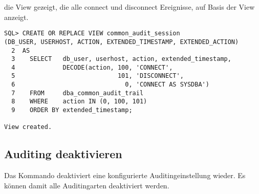         die View  gezeigt, die alle connect
        und disconnect Ereignisse, auf Basis der View
           anzeigt.
        \begin{lstlisting}[caption={Eine eigene View f\"ur dba\_common\_audit\_trail},label=admin817,language=oracle_sql]
SQL> CREATE OR REPLACE VIEW common_audit_session
(DB_USER, USERHOST, ACTION, EXTENDED_TIMESTAMP, EXTENDED_ACTION)
  2  AS
  3    SELECT   db_user, userhost, action, extended_timestamp,
  4             DECODE(action, 100, 'CONNECT',
  5                            101, 'DISCONNECT',
  6                              0, 'CONNECT AS SYSDBA')
  7    FROM     dba_common_audit_trail
  8    WHERE    action IN (0, 100, 101)
  9    ORDER BY extended_timestamp;

View created.
        \end{lstlisting}
      \subsection{Auditing deaktivieren}
        Das Kommando  deaktiviert eine konfigurierte Auditingeinstellung wieder. Es k\"on\-nen damit alle Auditingarten deaktiviert werden.

